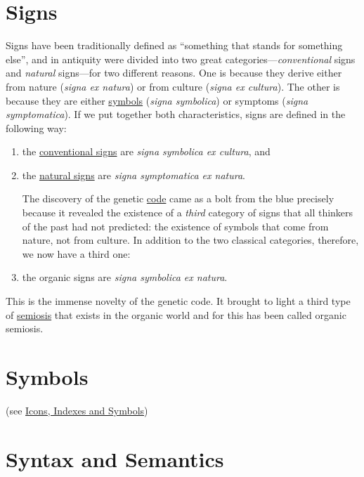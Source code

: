 \documentclass[12pt]{article}
\begin{document}
\section{Signs}
Signs have been traditionally defined as ``something that stands for something else'', and in antiquity were divided into two great categories---\textit{conventional} signs and \textit{natural} signs---for two different reasons. One is because they derive either from nature (\textit{signa ex natura}) or from culture (\textit{signa ex cultura}). The other is because they are either \hyperlink{icons_indexes_and_symbols}{symbols} (\textit{signa symbolica}) or symptoms (\textit{signa symptomatica}). If we put together both characteristics, signs are defined in the following way: 
\begin{enumerate}
\item the \hyperlink{conventional_signs}{conventional signs} are \textit{signa symbolica ex cultura}, and
\item the \hyperlink{natural_signs}{natural signs} are \textit{signa symptomatica ex natura}.

The discovery of the genetic \hyperlink{code}{code} came as a bolt from the blue precisely because it revealed the existence of a \textit{third} category of signs that all thinkers of the past had not predicted: the existence of symbols that come from nature, not from culture. In addition to the two classical categories, therefore, we now have a third one:

\item the organic signs are \textit{signa symbolica ex natura}.
\end{enumerate}
This is the immense novelty of the genetic code. It brought to light a third type of \hyperlink{semiosis}{semiosis} that exists in the organic world and for this has been called organic semiosis.
 

\hypertarget{symbols}{}
\section{Symbols} (see \hyperlink{icons_indexes_and_symbols}{Icons, Indexes and Symbols})

\hypertarget{syntax_and_semantics}{}
\section{Syntax and Semantics}
\end{document}
